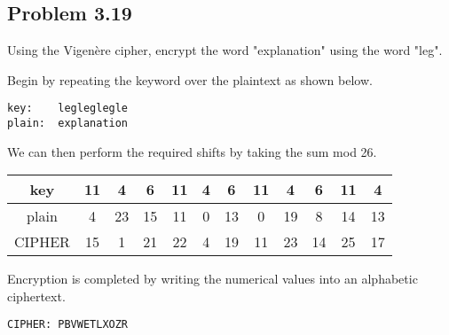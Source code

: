 \documentclass[../hw_sols.tex]{subfiles}
\begin{document}
\newpage



\subsection*{Problem 3.19}

Using the Vigenère cipher, encrypt the word "explanation" using the word 
"leg".

\begin{solution}

Begin by repeating the keyword over the plaintext as shown below.
\begin{Verbatim}
key:    legleglegle
plain:  explanation
\end{Verbatim}

We can then perform the required shifts by taking the sum mod 26.
\begin{center}
\begin{tabular}{ *{12}{| c } | }
	\hline
		key & 11 &  4 &  6 & 11 & 4 &  6 & 11 &  4 &  6 & 11 &  4 \\
	\hline
		plain &  4 & 23 & 15 & 11 & 0 & 13 &  0 & 19 &  8 & 14 & 13 \\
	\hline
	CIPHER & 15 &  1 & 21 & 22 & 4 & 19 & 11 & 23 & 14 & 25 & 17 \\
	\hline
\end{tabular}
\end{center}

Encryption is completed by writing the numerical values into an alphabetic 
ciphertext.
\begin{Verbatim}
CIPHER: PBVWETLXOZR
\end{Verbatim}

\end{solution}
\end{document}
